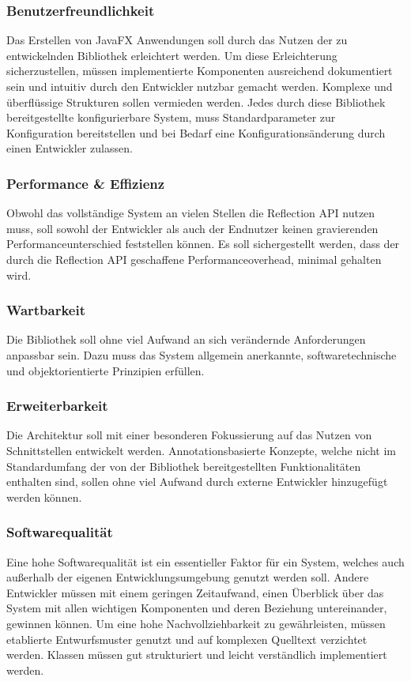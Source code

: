 \subsubsection{\nreq{} Benutzerfreundlichkeit}
Das Erstellen von JavaFX Anwendungen soll durch das Nutzen der zu entwickelnden Bibliothek erleichtert werden. Um diese Erleichterung sicherzustellen, müssen implementierte Komponenten ausreichend dokumentiert sein und intuitiv durch den Entwickler nutzbar gemacht werden. Komplexe und überflüssige Strukturen sollen vermieden werden. Jedes durch diese Bibliothek bereitgestellte konfigurierbare System, muss Standardparameter zur Konfiguration bereitstellen und bei Bedarf eine Konfigurationsänderung durch einen Entwickler zulassen.
\subsubsection{\nreq{} Performance \& Effizienz}
Obwohl das vollständige System an vielen Stellen die Reflection API nutzen muss, soll sowohl der Entwickler als auch der Endnutzer keinen gravierenden Performanceunterschied feststellen können. Es soll sichergestellt werden, dass der durch die Reflection API geschaffene Performanceoverhead, minimal gehalten wird.
\subsubsection{\nreq{} Wartbarkeit}
Die Bibliothek soll ohne viel Aufwand an sich verändernde Anforderungen anpassbar sein. Dazu muss das System allgemein anerkannte, softwaretechnische und objektorientierte Prinzipien erfüllen.
\subsubsection{\nreq{} Erweiterbarkeit}
Die Architektur soll mit einer besonderen Fokussierung auf das Nutzen von Schnittstellen entwickelt werden. Annotationsbasierte Konzepte, welche nicht im Standardumfang der von der Bibliothek bereitgestellten Funktionalitäten enthalten sind, sollen ohne viel Aufwand durch externe Entwickler hinzugefügt werden können.
\subsubsection{\nreq{} Softwarequalität}
Eine hohe Softwarequalität ist ein essentieller Faktor für ein System, welches auch außerhalb der eigenen Entwicklungsumgebung genutzt werden soll. Andere Entwickler müssen mit einem geringen Zeitaufwand, einen Überblick über das System mit allen wichtigen Komponenten und deren Beziehung untereinander, gewinnen können. Um eine hohe Nachvollziehbarkeit zu gewährleisten, müssen etablierte Entwurfsmuster genutzt und auf komplexen Quelltext verzichtet werden. Klassen müssen gut strukturiert und leicht verständlich implementiert werden.
